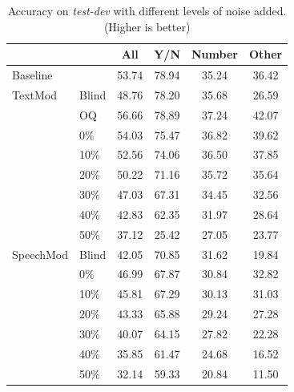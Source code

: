 \documentclass[letterpaper]{article} %
\begin{document}
\begin{table}[t]
\centering
\caption{Accuracy on \textit{test-dev} with different levels of noise added. (Higher is better)}
\label{table:vqa test-dev}
\begin{tabular}{ll|cccc}
          &                     & All    & Y/N    & Number & Other \\ \hline
Baseline  &                     & 53.74  & 78.94  & 35.24  & 36.42 \\ \hline
TextMod   & Blind               & 48.76  & 78.20  & 35.68  & 26.59 \\
          & OQ                  & 56.66  & 78,89  & 37.24  & 42.07 \\
          & 0\%                 & 54.03  & 75.47  & 36.82  & 39.62 \\
          & 10\%                & 52.56  & 74.06  & 36.50  & 37.85 \\
          & 20\%                & 50.22  & 71.16  & 35.72  & 35.64 \\
          & 30\%                & 47.03  & 67.31  & 34.45  & 32.56 \\
          & 40\%                & 42.83  & 62.35  & 31.97  & 28.64 \\
          & 50\%                & 37.12  & 25.42  & 27.05  & 23.77 \\ \hline
SpeechMod & Blind               & 42.05  & 70.85  & 31.62  & 19.84 \\ 
          & 0\%                 & 46.99  & 67.87  & 30.84  & 32.82 \\
          & 10\%                & 45.81  & 67.29  & 30.13  & 31.03 \\
          & 20\%                & 43.33  & 65.88  & 29.24  & 27.28 \\
          & 30\%                & 40.07  & 64.15  & 27.82  & 22.28 \\
          & 40\%                & 35.85  & 61.47  & 24.68  & 16.52 \\
          & 50\%                & 32.14  & 59.33  & 20.84  & 11.50 
\end{tabular}
\end{table}
\end{document}
